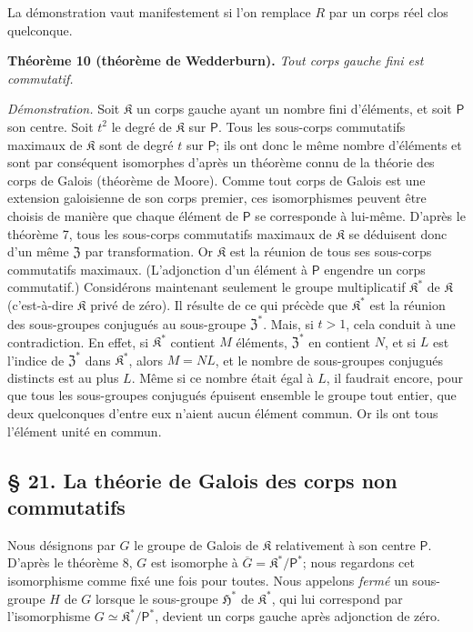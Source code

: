 La démonstration vaut manifestement si l'on remplace \(R\) par un corps réel clos quelconque.

\textbf{Théorème 10 (théorème de Wedderburn).} \emph{Tout corps gauche fini est commutatif.}

\emph{Démonstration.} Soit \(\mathfrak K\) un corps gauche ayant un nombre fini d'éléments, et soit \(\mathsf P\) son centre. Soit \(t^2\) le degré de \(\mathfrak K\) sur \(\mathsf P\). Tous les sous-corps commutatifs maximaux de \(\mathfrak K\) sont de degré \(t\) sur \(\mathsf P\); ils ont donc le même nombre d'éléments et sont par conséquent isomorphes d'après un théorème connu de la théorie des corps de Galois (théorème de Moore). Comme tout corps de Galois est une extension galoisienne de son corps premier, ces isomorphismes peuvent être choisis de manière que chaque élément de \(\mathsf P\) se corresponde à lui-même. D'après le théorème 7, tous les sous-corps commutatifs maximaux de \(\mathfrak K\) se déduisent donc d'un même \(\mathfrak Z\) par transformation. Or \(\mathfrak K\) est la réunion de tous ses sous-corps commutatifs maximaux. (L'adjonction d'un élément à \(\mathsf P\) engendre un corps commutatif.) Considérons maintenant seulement le groupe multiplicatif \(\mathfrak K^*\) de \(\mathfrak K\) (c'est-à-dire \(\mathfrak K\) privé de zéro). Il résulte de ce qui précède que \(\mathfrak K^*\) est la réunion des sous-groupes conjugués au sous-groupe \(\mathfrak Z^*\). Mais, si \(t>1\), cela conduit à une contradiction. En effet, si \(\mathfrak K^*\) contient \(M\) éléments, \(\mathfrak Z^*\) en contient \(N\), et si \(L\) est l'indice de \(\mathfrak Z^*\) dans \(\mathfrak K^*\), alors \(M=NL\), et le nombre de sous-groupes conjugués distincts est au plus \(L\). Même si ce nombre était égal à \(L\), il faudrait encore, pour que tous les sous-groupes conjugués épuisent ensemble le groupe tout entier, que deux quelconques d'entre eux n'aient aucun élément commun. Or ils ont tous l'élément unité en commun.

\subsection*{\S{} 21. La théorie de Galois des corps non commutatifs}\label{fr-r823-theorie-galois-corps-non-commutatifs}

Nous désignons par \(G\) le groupe de Galois de \(\mathfrak K\) relativement à son centre \(\mathsf P\). D'après le théorème 8, \(G\) est isomorphe à \(\overline G=\mathfrak K^*/\mathsf P^*\); nous regardons cet isomorphisme comme fixé une fois pour toutes. Nous appelons \emph{fermé} un sous-groupe \(H\) de \(G\) lorsque le sous-groupe \(\mathfrak H^*\) de \(\mathfrak K^*\), qui lui correspond par l'isomorphisme \(G\simeq\mathfrak K^*/\mathsf P^*\), devient un corps gauche après adjonction de zéro.

